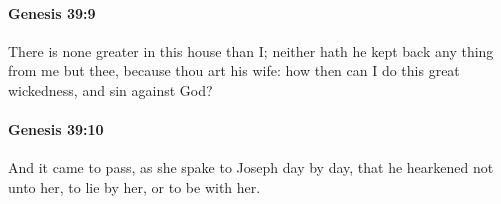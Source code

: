 		\paragraph{Genesis 39:9} %
			\label{GENESIS-39-9}

			There is none greater in this house than I; neither hath he kept back any thing from me but thee, because thou art his wife: how then can I do this great wickedness, and sin against God?


		\paragraph{Genesis 39:10} %
			\label{GENESIS-39-10}

			And it came to pass, as she spake to Joseph day by day, that he hearkened not unto her, to lie by her, or to be with her.


